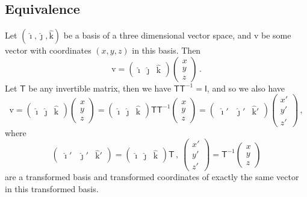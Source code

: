 \documentclass{article}
\theoremstyle{plain}\theoremheaderfont{\normalfont\itshape}\theorembodyfont{\rmfamily}\theoremseparator{.}\newtheorem*{rem}{Remark}\newtheorem*{ex}{Example}\newtheorem*{proof}{Proof}\newtheorem*{altp}{Alternative proof}
\theoremstyle{plain}\theoremheaderfont{\normalfont\bfseries}\theorembodyfont{\rmfamily}\theoremseparator{.}\newtheorem{thm}{Theorem}[section]\newtheorem{lem}[thm]{Lemma}\newtheorem{prop}[thm]{Proposition}\newtheorem*{cor}{Corollary}\newtheorem{defn}[thm]{Definition}\newtheorem{clm}[thm]{Claim}\newtheorem{clminproof}{Claim}\newtheorem*{law}{Law}\newtheorem{pos}[thm]{Postulate}
\theoremstyle{break}\theoremheaderfont{\normalfont\itshape}\theorembodyfont{\rmfamily}\theoremseparator{.\medskip}\newtheorem*{proofskip}{Proof}\newtheorem*{exs}{Examples}\newtheorem*{rems}{Remarks}
\theoremstyle{break}\theoremheaderfont{\normalfont\bfseries}\theorembodyfont{\rmfamily}\theoremseparator{.\medskip}\newtheorem{lemskip}[thm]{Lemma}\newtheorem{defnskip}[thm]{Definition}\newtheorem{propskip}[thm]{Proposition}\newtheorem{thmskip}[thm]{Theorem}
\numberwithin{equation}{section}
\newcommand{\vb}[1]{\bm{\mathrm{#1}}}
\newcommand{\vu}[1]{\hat{\bm{\mathrm{#1}}}}
\newcommand{\II}{\mathsf{I}}
\newcommand{\TT}{\mathsf{T}}
\begin{document}
    \subsection{Equivalence}
    Let \((\vu{\imath}, \vu{\jmath}, \vu{k})\) be a basis of a three dimensional vector space, and \(\vb{v}\) be some vector with coordinates \((x,y,z)\) in this basis. Then
    \begin{equation}
        \vb{v}=\begin{pmatrix}
            \vu{\imath} & \vu{\jmath} & \vu{k}
        \end{pmatrix}\begin{pmatrix}
            x \\ y \\ z
        \end{pmatrix}\,.
    \end{equation}
    Let \(\TT\) be any invertible matrix, then we have \(\TT\TT^{-1}=\II\), and so we also have
    \begin{equation}
        \vb{v}=\begin{pmatrix}
            \vu{\imath} & \vu{\jmath} & \vu{k}
        \end{pmatrix}\begin{pmatrix}
            x \\ y \\ z
        \end{pmatrix}=\begin{pmatrix}
            \vu{\imath} & \vu{\jmath} & \vu{k}
        \end{pmatrix}\TT\TT^{-1}\begin{pmatrix}
            x \\ y \\ z
        \end{pmatrix}=\begin{pmatrix}
            \vu{\imath}' & \vu{\jmath}' & \vu{k}'
        \end{pmatrix}\begin{pmatrix}
            x' \\ y' \\ z'
        \end{pmatrix}\,,
    \end{equation}
    where
    \begin{equation}
        \begin{pmatrix}
            \vu{\imath}' & \vu{\jmath}' & \vu{k}'
        \end{pmatrix}=\begin{pmatrix}
            \vu{\imath} & \vu{\jmath} & \vu{k}
        \end{pmatrix}\TT\,,\ \begin{pmatrix}
            x' \\ y' \\ z'
        \end{pmatrix}=\TT^{-1}\begin{pmatrix}
            x \\ y \\ z
        \end{pmatrix}
    \end{equation}
    are a transformed basis and transformed coordinates of exactly the same vector in this transformed basis.
\end{document}
